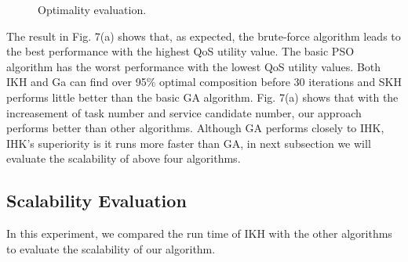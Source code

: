 \documentclass[10pt,journal,compsoc]{IEEEtran}
\begin{document}
\begin{figure}[!t]
\centering
{}
\hfil
{}
\hfil
{}

\caption{Optimality evaluation.} \label{fig_sim}
\end{figure}




The result in Fig. 7(a) shows that, as expected, the brute-force algorithm leads to the best performance with the highest QoS utility value. The basic PSO algorithm has the worst performance with the lowest QoS utility values. Both IKH and Ga can find over 95\% optimal composition before 30 iterations and SKH performs little better than the basic GA algorithm. 
Fig. 7(a) shows that with the increasement of task number and service candidate number, our approach performs better than other algorithms.
Although GA performs closely to IHK, IHK's superiority is it runs more faster than GA, in next subsection we will evaluate the scalability of above four algorithms.

\subsection{Scalability Evaluation}
In this experiment, we compared the run time of IKH with the other algorithms to evaluate the scalability of our algorithm.
\end{document}

